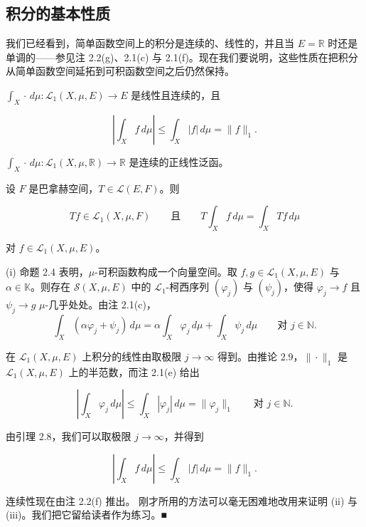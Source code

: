 \subsection*{积分的基本性质}

我们已经看到，简单函数空间上的积分是连续的、线性的，并且当 $ E = \mathbb{R} $ 时还是单调的——参见注 2.2(g)、2.1(c) 与 2.1(f)。现在我们要说明，这些性质在把积分从简单函数空间延拓到可积函数空间之后仍然保持。

\begin{theorem}

\begin{subitems}
\item

$ \int_X \cdot \, d\mu: \mathcal{L}_1(X,\mu,E) \to E $ 是线性且连续的，且

\[
\left| \int_X f \, d\mu \right| \le \int_X |f| \, d\mu = \|f\|_1 .
\]
\item

$ \int_X \cdot \, d\mu: \mathcal{L}_1(X,\mu,\mathbb{R}) \to \mathbb{R} $ 是连续的正线性泛函。

\item

设 $ F $ 是巴拿赫空间，$ T \in \mathcal{L}(E,F) $。则

\[
Tf \in \mathcal{L}_1(X,\mu,F) \qquad \text{且} \qquad T \int_X f \, d\mu = \int_X Tf \, d\mu
\]

对 $ f \in \mathcal{L}_1(X,\mu,E) $。

\proofhead
(i) 命题 2.4 表明，$ \mu $-可积函数构成一个向量空间。取 $ f, g \in \mathcal{L}_1(X,\mu,E) $ 与 $ \alpha \in \mathbb{K} $。则存在 $ \mathcal{S}(X,\mu,E) $ 中的 $ \mathcal{L}_1 $-柯西序列 $ (\varphi_j) $ 与 $ (\psi_j) $，使得 $ \varphi_j \to f $ 且 $ \psi_j \to g $ $ \mu $-几乎处处。由注 2.1(c)，
\[
\int_X (\alpha\varphi_j + \psi_j) \, d\mu = \alpha \int_X \varphi_j \, d\mu + \int_X \psi_j \, d\mu \qquad \text{对 } j \in \mathbb{N} .
\]

在 $ \mathcal{L}_1(X,\mu,E) $ 上积分的线性由取极限 $ j \to \infty $ 得到。由推论 2.9，$ \|\cdot\|_1 $ 是 $ \mathcal{L}_1(X,\mu,E) $ 上的半范数，而注 2.1(e) 给出

\[
\left| \int_X \varphi_j \, d\mu \right| \le \int_X |\varphi_j| \, d\mu = \|\varphi_j\|_1 \qquad \text{对 } j \in \mathbb{N} .
\]

由引理 2.8，我们可以取极限 $ j \to \infty $，并得到

\[
\left| \int_X f \, d\mu \right| \le \int_X |f| \, d\mu = \|f\|_1 .
\]

连续性现在由注 2.2(f) 推出。
刚才所用的方法可以毫无困难地改用来证明 (ii) 与 (iii)。我们把它留给读者作为练习。\nobreak\hspace{0.35em}■

\end{subitems}

\end{theorem}

